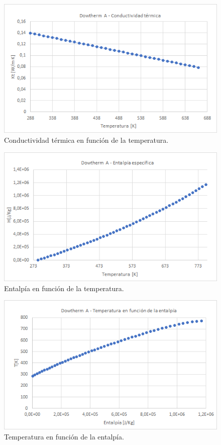 \begin{figure}
\includegraphics[scale=0.8]{images/curva_conductividad_termica.png}
\caption{Conductividad térmica en función de la temperatura.} 
\label{fig:curvaconductividad}
\end{figure}

\begin{figure}
\includegraphics[scale=0.8]{images/curva_entalpia.png}
\caption{Entalpía en función de la temperatura.} 
\label{fig:curvaentalpia}
\end{figure}

\begin{figure}
\includegraphics[scale=0.8]{images/curva_temperatura_entalpia.png}
\caption{Temperatura en función de la entalpía.} 
\label{fig:curvatemperatura}
\end{figure}

